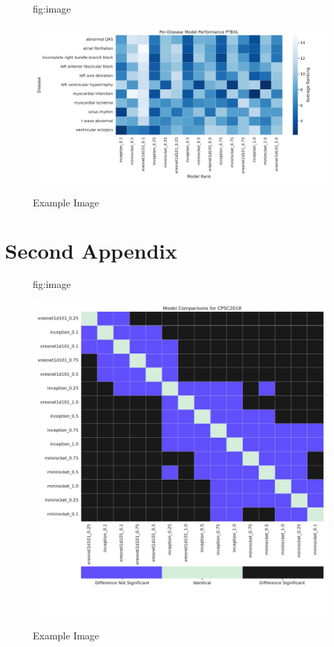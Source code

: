 \documentclass[pmlr,twocolumn]{jmlr}%
\begin{document}
\begin{figure}[tbp]
\floatconts
  {fig:image}
  {\caption{Example Image}}
  {\includegraphics[width=1\linewidth]{images/Per-Disease_Model_Performance_PTBXL.pdf}}
\end{figure}

\section{Second Appendix}\label{apd:second}
\begin{figure}[tbp]
\floatconts
  {fig:image}
  {\caption{Example Image}}
  {\includegraphics[width=1\linewidth]{images/model_comparisons_alldatasets.pdf}}
\end{figure}
\end{document}
